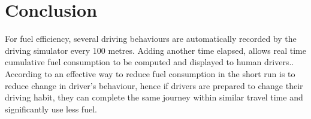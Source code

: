 \documentclass{book}
\begin{document}
\section{Conclusion}
For fuel efficiency, several driving behaviours are automatically recorded by the driving simulator every 100 metres. Adding another time elapsed, allows real time cumulative fuel consumption to be computed and displayed to human drivers.\cite{wu2011fuel}. According to\cite{van2001prototype} an effective way to reduce fuel consumption in the short run is to reduce change in driver's behaviour, hence if drivers are prepared to change their driving habit, they can complete the same journey within similar travel time and significantly use less fuel.\\

\end{document}

